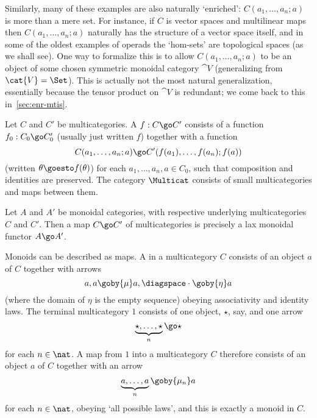 Similarly, many of these examples are also naturally `enriched':%
%
%
%
% 
$C(a_1, \ldots, a_n; a)$ is more than a mere set.  For instance, if $C$ is
vector spaces and multilinear maps then $C(a_1, \ldots, a_n; a)$ naturally
has the structure of a vector space itself, and in some of the oldest
examples of operads the `hom-sets' are topological spaces (as we shall
see).  One way to formalize this is to allow $C(a_1, \ldots, a_n; a)$ to be
an object of some chosen symmetric%
%
%
monoidal category $\cat{V}$ (generalizing from $\cat{V} = \Set$).  This is
actually not the most natural generalization, essentially because the
tensor product on $\cat{V}$ is redundant; we come back to this
in~\ref{sec:enr-mtis}.


\begin{defn}
Let $C$ and $C'$ be multicategories.  A  $f:
C \go C'$ consists of a function $f_0: C_0 \go C'_0$ (usually just written
$f$) together with a function
\[
C(a_1, \ldots, a_n; a) \go C'(f(a_1), \ldots, f(a_n); f(a))
\]
(written $\theta \goesto f(\theta)$) for each $a_1, \ldots, a_n, a \in
C_0$, such that composition and identities are preserved.  The category
$\Multicat$%
% 
% 
consists of small multicategories and maps between them.
\end{defn}

\begin{example}	%
%
%
Let $A$ and $A'$ be monoidal categories, with respective underlying
multicategories $C$ and $C'$.  Then a map $C \go C'$ of multicategories is
precisely a lax monoidal functor $A \go A'$.
\end{example}

\begin{example}
Monoids can be described as maps.  A %
%
%
in a multicategory $C$
consists of an object $a$ of $C$ together with arrows
\[
a, a \goby{\mu} a,
\diagspace
\cdot \goby{\eta} a
\]
(where the domain of $\eta$ is the empty sequence) obeying associativity
and identity laws.  The terminal%
%
%
multicategory $1$ consists of one object,
$\star$, say, and one arrow
\[
\underbrace{\star, \ldots, \star}_n \go \star
\]
for each $n\in\nat$.  A map from $1$ into a multicategory $C$ therefore
consists of an object $a$ of $C$ together with an arrow
\[
\underbrace{a, \ldots, a}_n \goby{\mu_n} a
\]
for each $n\in\nat$, obeying `all possible laws', and this is exactly a
monoid in $C$. 
\end{example}

